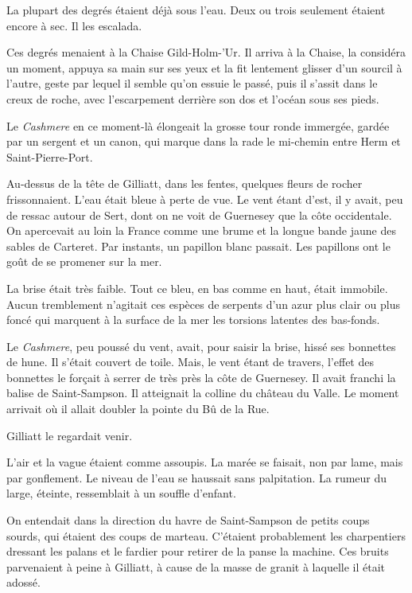 \documentclass[french,twoside]{book} %
\begin{document}
La plupart des degrés étaient déjà sous l’eau. Deux ou trois seulement étaient encore à sec. Il les escalada.\par
Ces degrés menaient à la Chaise Gild-Holm-’Ur. Il arriva à la Chaise, la considéra un moment, appuya sa main sur ses yeux et la fit lentement glisser d’un sourcil à l’autre, geste par lequel il semble qu’on essuie le passé, puis il s’assit dans le creux de roche, avec l’escarpement derrière son dos et l’océan sous ses pieds.\par
Le \emph{Cashmere} en ce moment-là élongeait la grosse tour ronde immergée, gardée par un sergent et un canon, qui marque dans la rade le mi-chemin entre Herm et Saint-Pierre-Port.\par
Au-dessus de la tête de Gilliatt, dans les fentes, quelques fleurs de rocher frissonnaient. L’eau était bleue à perte de vue. Le vent étant d’est, il y avait,  peu de ressac autour de Sert, dont on ne voit de Guernesey que la côte occidentale. On apercevait au loin la France comme une brume et la longue bande jaune des sables de Carteret. Par instants, un papillon blanc passait. Les papillons ont le goût de se promener sur la mer.\par
La brise était très faible. Tout ce bleu, en bas comme en haut, était immobile. Aucun tremblement n’agitait ces espèces de serpents d’un azur plus clair ou plus foncé qui marquent à la surface de la mer les torsions latentes des bas-fonds.\par
Le \emph{Cashmere}, peu poussé du vent, avait, pour saisir la brise, hissé ses bonnettes de hune. Il s’était couvert de toile. Mais, le vent étant de travers, l’effet des bonnettes le forçait à serrer de très près la côte de Guernesey. Il avait franchi la balise de Saint-Sampson. Il atteignait la colline du château du Valle. Le moment arrivait où il allait doubler la pointe du Bû de la Rue.\par
Gilliatt le regardait venir.\par
L’air et la vague étaient comme assoupis. La marée se faisait, non par lame, mais par gonflement. Le niveau de l’eau se haussait sans palpitation. La rumeur du large, éteinte, ressemblait à un souffle d’enfant.\par
On entendait dans la direction du havre de Saint-Sampson de petits coups sourds, qui étaient des coups de marteau. C’étaient probablement les charpentiers dressant les palans et le fardier pour retirer de la panse la machine. Ces bruits parvenaient à peine à  Gilliatt, à cause de la masse de granit à laquelle il était adossé.\par
\end{document}

